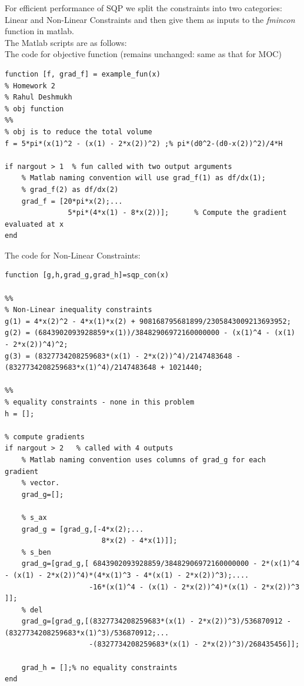 \documentclass[12pt]{article}
\begin{document}
\begin{enumerate}[I]
\begin{enumerate}[1)]
For efficient performance of SQP we split the constraints into two categories: Linear and Non-Linear Constraints and then give them as inputs to the \textit{fmincon} function in matlab.\\

The Matlab scripts are as follows:\\
The code for objective function (remains unchanged: same as that for MOC)
\begin{lstlisting}
function [f, grad_f] = example_fun(x)
% Homework 2 
% Rahul Deshmukh
% obj function 
%%
% obj is to reduce the total volume
f = 5*pi*(x(1)^2 - (x(1) - 2*x(2))^2) ;% pi*(d0^2-(d0-x(2))^2)/4*H    

if nargout > 1  % fun called with two output arguments
    % Matlab naming convention will use grad_f(1) as df/dx(1); 
    % grad_f(2) as df/dx(2)
    grad_f = [20*pi*x(2);... 
               5*pi*(4*x(1) - 8*x(2))];      % Compute the gradient evaluated at x
end
\end{lstlisting}
The code for Non-Linear Constraints:
\begin{lstlisting}
function [g,h,grad_g,grad_h]=sqp_con(x)

%%
% Non-Linear inequality constraints
g(1) = 4*x(2)^2 - 4*x(1)*x(2) + 908168795681899/2305843009213693952;
g(2) = (6843902093928859*x(1))/38482906972160000000 - (x(1)^4 - (x(1) - 2*x(2))^4)^2;
g(3) = (8327734208259683*(x(1) - 2*x(2))^4)/2147483648 - (8327734208259683*x(1)^4)/2147483648 + 1021440;

%%
% equality constraints - none in this problem
h = [];

% compute gradients
if nargout > 2   % called with 4 outputs
    % Matlab naming convention uses columns of grad_g for each gradient
    % vector. 
    grad_g=[];
    
    % s_ax
    grad_g = [grad_g,[-4*x(2);...
                       8*x(2) - 4*x(1)]]; 
    % s_ben
    grad_g=[grad_g,[ 6843902093928859/38482906972160000000 - 2*(x(1)^4 - (x(1) - 2*x(2))^4)*(4*x(1)^3 - 4*(x(1) - 2*x(2))^3);....
                    -16*(x(1)^4 - (x(1) - 2*x(2))^4)*(x(1) - 2*x(2))^3 ]];       
    % del
    grad_g=[grad_g,[(8327734208259683*(x(1) - 2*x(2))^3)/536870912 - (8327734208259683*x(1)^3)/536870912;...
                    -(8327734208259683*(x(1) - 2*x(2))^3)/268435456]];            
    
    grad_h = [];% no equality constraints
end


\end{lstlisting}
\end{enumerate}
\end{enumerate}
\end{document}
